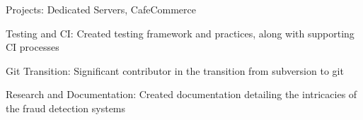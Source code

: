 \item Projects: Dedicated Servers, CafeCommerce
\item Testing and CI: Created testing framework and practices, along with supporting CI processes
\item Git Transition: Significant contributor in the transition from subversion to git
\item Research and Documentation: Created documentation detailing the intricacies of the fraud detection systems
